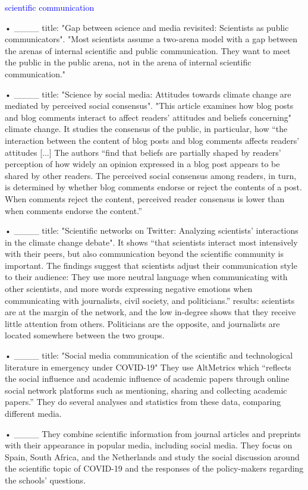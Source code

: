 \begin{itemize}
\textcolor{blue}{scientific communication}

• ____ title: "Gap between science and media revisited: Scientists as public communicators". 
"Most scientists assume a two-arena model with a gap between the arenas of internal scientific and public communication. They want to meet the public in the public arena, not in the arena of internal scientific communication."

• ____ title: "Science by social media: Attitudes towards climate change are mediated by perceived social consensus". "This article examines how blog posts and blog comments interact to affect readers’ attitudes and beliefs concerning" climate change. It studies the consensus of the public, in particular, how “the interaction between the content of blog posts and blog comments affects readers’ attitudes [...] The authors “find that beliefs are partially shaped by readers’ perception of how widely an opinion expressed in a blog post appears to be shared by other readers. The perceived social consensus among readers, in turn, is determined by whether blog comments endorse or reject the contents of a post. When comments reject the content, perceived reader consensus is lower than when comments endorse the content.” 

• ____ title: "Scientific networks on Twitter: Analyzing scientists' interactions in the climate change debate". It shows “that scientists interact most intensively with their peers, but also communication beyond the scientific community is important. The findings suggest that scientists adjust their communication style to their audience: They use more neutral language when communicating with other scientists, and more words expressing negative emotions when communicating with journalists, civil society, and politicians.”
results: scientists are at the margin of the network, and the low in-degree shows that they receive little attention from others. Politicians are the opposite, and journalists are located somewhere between the two groups.

• ____ title: "Social media communication of the scientific and technological literature in emergency under COVID-19" They use AltMetrics which “reflects the social influence and academic influence of academic papers through online social network platforms such as mentioning, sharing and collecting academic papers.” They do several analyses and statistics from these data, comparing different media.

• ____ They combine scientific information from journal articles and preprints with their appearance in popular media, including social media. They focus on Spain, South Africa, and the Netherlands and study the social discussion around the scientific topic of COVID-19 and the responses of the policy-makers regarding the schools’ questions.







\end{itemize}
